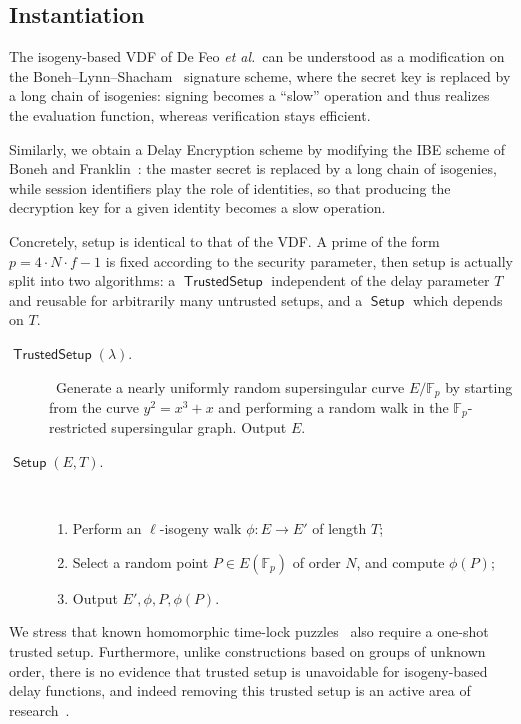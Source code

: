 \documentclass{llncs}
\newcommand{\F}{\mathbb{F}}
\DeclareMathOperator{\Setup}{\mathsf{Setup}}
\DeclareMathOperator{\TSetup}{\mathsf{TrustedSetup}}
\begin{document}
\subsection{Instantiation}

The isogeny-based VDF of De Feo \emph{et al.}\ can be understood as a
modification on the Boneh--Lynn--Shacham~\cite{boneh+lynn+shacham04}
signature scheme, where the secret key is replaced by a long chain of
isogenies: signing becomes a ``slow'' operation and thus realizes the
evaluation function, whereas verification stays efficient.

Similarly, we obtain a Delay Encryption scheme by modifying the IBE
scheme of Boneh and Franklin~\cite{doi:10.1137/S0097539701398521}: the
master secret is replaced by a long chain of isogenies, while session
identifiers play the role of identities, so that producing the
decryption key for a given identity becomes a slow operation.

Concretely, setup is identical to that of the VDF. %
A prime of the form $p=4\cdot N\cdot f - 1$ is fixed according to the
security parameter, then setup is actually split into two algorithms:
a $\TSetup$ independent of the delay parameter $T$ and reusable for
arbitrarily many untrusted setups, and a $\Setup$ which depends on
$T$.

\begin{description}
\item[$\TSetup(\lambda)$.]\
  Generate a nearly uniformly random supersingular curve
  $E/\F_p$ by starting from the curve $y^2=x^3+x$ and performing a
  random walk in the $\F_p$-restricted supersingular graph. %
  Output $E$.
\item[$\Setup(E,T)$.]\
  \begin{enumerate}
  \item Perform an $\ell$-isogeny walk $\phi:E\to E'$ of length $T$;
  \item Select a random point $P\in E(\F_p)$ of order $N$, and compute
    $\phi(P)$;
  \item Output $E',\phi,P,\phi(P)$.
  \end{enumerate}
\end{description}

We stress that known homomorphic time-lock puzzles~\cite{C:MalThy19}
also require a one-shot trusted setup. %
Furthermore, unlike constructions based on groups of unknown order,
there is no evidence that trusted setup is unavoidable for
isogeny-based delay functions, and indeed removing this trusted setup
is an active area of
research~\cite{10.1007/978-3-030-45724-2_18,love2019supersingular}.
\end{document}
